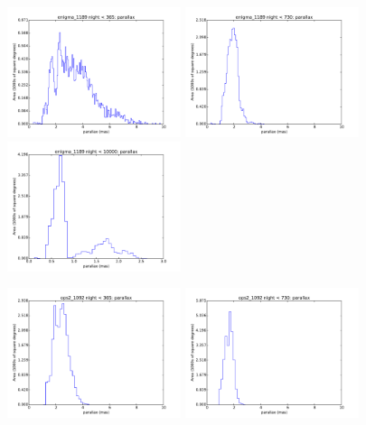\begin{figure}[ht]
  \begin{center}
  \includegraphics[width=2.0in]{./figs/milkyway/MW_Astrom_paError_1189_01y_hst.pdf}
  \includegraphics[width=2.0in]{./figs/milkyway/MW_Astrom_paError_1189_02y_hst.pdf}
  \includegraphics[width=2.0in]{./figs/milkyway/MW_Astrom_paError_1189_10y_hst.pdf}
  \end{center}
  \begin{center}
  \includegraphics[width=2.0in]{./figs/milkyway/MW_Astrom_paError_1092_01y_hst.pdf}
  \includegraphics[width=2.0in]{./figs/milkyway/MW_Astrom_paError_1092_02y_hst.pdf}

\end{center}
\end{figure}
